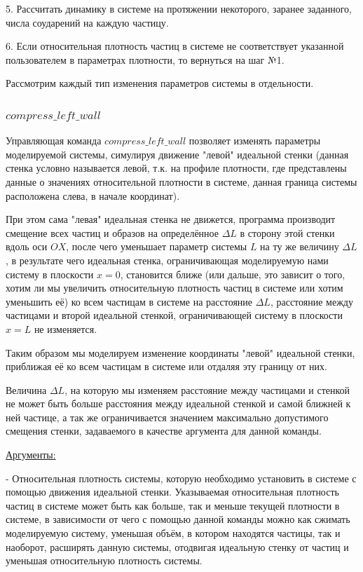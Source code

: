 \documentclass[a4paper]{article}
\begin{document}
5. Рассчитать динамику в системе на протяжении некоторого, заранее заданного, числа соударений на каждую частицу.

6. Если относительная плотность частиц в системе не соответствует указанной пользователем в параметрах плотности, то вернуться на шаг №1.

Рассмотрим каждый тип изменения параметров системы в отдельности.

\subsubsection{$ compress\_left\_wall $}
Управляющая команда $ compress\_left\_wall $ позволяет изменять параметры моделируемой системы, симулируя движение "левой" идеальной стенки (данная стенка условно называется левой, т.к. на профиле плотности, где представлены данные о значениях относительной плотности в системе, данная граница системы расположена слева, в начале координат).

При этом сама "левая" идеальная стенка не движется, программа производит смещение всех частиц и образов на определённое $ \Delta L $ в сторону этой стенки вдоль оси $ OX $, после чего уменьшает параметр системы $ L $ на ту же величину $ \Delta L $, в результате чего идеальная стенка, ограничивающая моделируемую нами систему в плоскости $ x = 0 $, становится ближе (или дальше, это зависит о того, хотим ли мы увеличить относительную плотность частиц в системе или хотим уменьшить её) ко всем частицам в системе на расстояние $ \Delta L $, расстояние между частицами и второй идеальной стенкой, ограничивающей систему в плоскости $ x = L $ не изменяется.

Таким образом мы моделируем изменение координаты "левой" идеальной стенки, приближая её ко всем частицам в системе или отдаляя эту границу от них.

Величина $ \Delta L $, на которую мы изменяем расстояние между частицами и стенкой не может быть больше расстояния между идеальной стенкой и самой ближней к ней частице, а так же ограничивается значением максимально допустимого смещения стенки, задаваемого в качестве аргумента для данной команды.

\uline{Аргументы:}

- Относительная плотность системы, которую необходимо установить в системе с помощью движения идеальной стенки. Указываемая относительная плотность частиц в системе может быть как больше, так и меньше текущей плотности в системе, в зависимости от чего с помощью данной команды можно как сжимать моделируемую систему, уменьшая объём, в котором находятся частицы, так и наоборот, расширять данную системы, отодвигая идеальную стенку от частиц и уменьшая относительную плотность системы.
\end{document}
